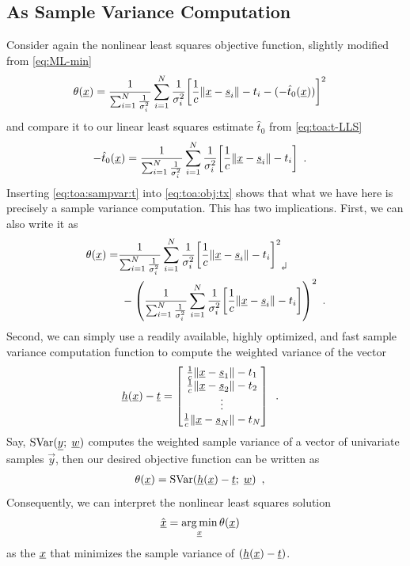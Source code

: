 \documentclass[conference]{IEEEtran}
\begin{document}
\subsection{As Sample Variance Computation}
\label{eq:TOA:Var}
Consider again the nonlinear least squares objective function, slightly modified from \cref{eq:ML-min} 
\begin{align}
    \theta({\underline{x}}) &= \frac{1}{\sum_{i=1}^N \frac{1}{\sigma_i^2}}  \sum_{i=1}^N  \frac{1}{\sigma_i^2} {\mathopen{}\left[ \frac{1}{c}\mathopen{}\left\| {\underline{x}}-{\underline{s}}_i \right\|\mathclose{} - t_i - (-\hat t_0({\underline{x}}))  \right]\mathclose{}}^2 \label{eq:toa:obj:tx}
\end{align}
and compare it to our linear least squares estimate $\hat t_0$ from \cref{eq:toa:t-LLS}
\begin{align}
    -\hat t_0({\underline{x}}) &= \frac{1}{\sum_{i=1}^N\frac{1}{\sigma_i^2}} \sum_{i=1}^N \frac{1}{\sigma_i^2} \mathopen{}\left[ \frac{1}{c}\mathopen{}\left\| {\underline{x}}-{\underline{s}}_i \right\|\mathclose{}-t_i \right]\mathclose{} \enspace. \label{eq:toa:sampvar:t}
\end{align}
Inserting \cref{eq:toa:sampvar:t} into \cref{eq:toa:obj:tx} shows that what we have here is precisely a sample variance computation. This has two implications. 
%
%
First, we can also write it as 
\begin{align}
    \theta(\x) =& \frac{1}{\sum_{i=1}^N \frac{1}{\sigma_i^2}}  \sum_{i=1}^N  \frac{1}{\sigma_i^2} {\brackets{\frac{1}{c}\abss{\x-\s_i} - t_i }}^2 
    \text{\raisebox{-.7\baselineskip}[0pt][0pt]{\rotatebox[origin=c]{180}{$\Rsh$}}}  \\
    & \; - {\paren{ \frac{1}{\sum_{i=1}^N \frac{1}{\sigma_i^2}}  \sum_{i=1}^N  \frac{1}{\sigma_i^2} {\brackets{\frac{1}{c}\abss{\x-\s_i} - t_i }} }}^2 \enspace. 
\end{align}
%
%
Second, we can simply use a readily available, highly optimized, and fast sample variance computation function to compute the weighted variance of the vector 
\begin{align}
    \underline{h}({\underline{x}})-{\underline{t}} 
    &= \begin{bmatrix}
        \tfrac{1}{c} \mathopen{}\left\| {\underline{x}}-{\underline{s}}_1 \right\|\mathclose{} - t_1 \\
        \tfrac{1}{c} \mathopen{}\left\| {\underline{x}}-{\underline{s}}_2 \right\|\mathclose{} - t_2 \\
        \vdots  \\ 
        \tfrac{1}{c} \mathopen{}\left\| {\underline{x}}-{\underline{s}}_N \right\|\mathclose{} - t_N
    \end{bmatrix}
    \enspace. \label{eq:TOA:variance:alpha}
\end{align}
Say, $\op{SVar}(\vec y ;\; \w)$ computes the weighted sample variance of a vector of univariate samples $\vec y$, then our desired objective function can be written as
\begin{align}
    \theta(\x) &= \op{SVar}(\vec h(\x)-\t ;\; \w) \enspace, 
\end{align}
%
%
Consequently, we can interpret the nonlinear least squares solution 
\begin{align}
    \hat {{\underline{x}}} &= \operatorname*{arg\,min}_{\underline{x}} \theta({\underline{x}}) \label{eq:toa:sol}
\end{align}
as the ${\underline{x}}$ that minimizes the sample variance of $\mathopen{}\left( \underline{h}({\underline{x}})-{\underline{t}} \right)\mathclose{}$. 
\end{document}
